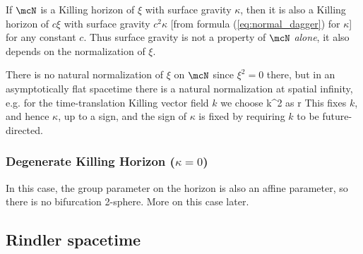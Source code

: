 If $\mcN$ is a Killing horizon of $\xi$ with surface gravity $\kappa$, 
then it is also a Killing horizon of $c\xi$ with surface gravity $c^2\kappa$
[from formula (\ref{eq:normal_dagger}) for $\kappa$] for any constant $c$.  
Thus surface gravity is not a property of $\mcN$ \emph{alone}, it also 
depends on the normalization of $\xi$. 

There is no natural normalization of $\xi$ on $\mcN$ since $\xi^2=0$ there, 
but in an asymptotically flat spacetime there is a natural normalization at
spatial infinity, e.g. for the time-translation Killing vector field $k$ we
choose
\be
k^2 \quad \mbox{as} \quad r\to\infty
\ee
This fixes $k$, and hence $\kappa$, up to a sign, and the sign of $\kappa$ 
is fixed by requiring $k$ to be future-directed.

\subsubsection{Degenerate Killing Horizon ($\kappa=0$)}

In this case, the group parameter on the horizon is also an affine parameter, 
so there is no bifurcation 2-sphere.  More on this case later.

\subsection{Rindler spacetime}

